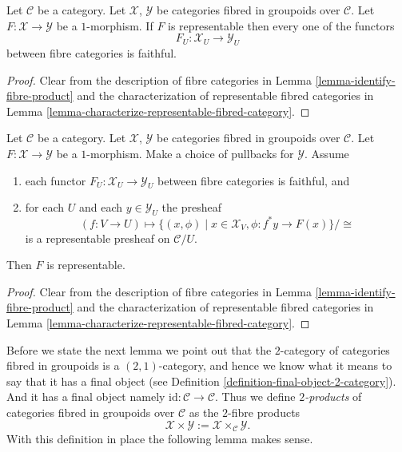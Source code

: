 \begin{lemma}
\label{lemma-spell-out-representable-map-stack-in-groupoids}
Let $\mathcal{C}$ be a category.
Let $\mathcal{X}$, $\mathcal{Y}$ be categories fibred in groupoids
over $\mathcal{C}$.
Let $F : \mathcal{X} \to \mathcal{Y}$ be a $1$-morphism.
If $F$ is representable then every one of the functors
$$
F_U : \mathcal{X}_U \longrightarrow \mathcal{Y}_U
$$
between fibre categories is faithful.
\end{lemma}

\begin{proof}
Clear from the description of fibre categories in
Lemma \ref{lemma-identify-fibre-product} and the characterization
of representable fibred categories in
Lemma \ref{lemma-characterize-representable-fibred-category}.
\end{proof}

\begin{lemma}
\label{lemma-criterion-representable-map-stack-in-groupoids}
Let $\mathcal{C}$ be a category.
Let $\mathcal{X}$, $\mathcal{Y}$ be categories fibred in groupoids
over $\mathcal{C}$.
Let $F : \mathcal{X} \to \mathcal{Y}$ be a $1$-morphism.
Make a choice of pullbacks for $\mathcal{Y}$.
Assume
\begin{enumerate}
\item each functor $F_U : \mathcal{X}_U \longrightarrow \mathcal{Y}_U$
between fibre categories is faithful, and
\item for each $U$ and each $y \in \mathcal{Y}_U$ the presheaf
$$
(f : V \to U)
\longmapsto
\{(x, \phi) \mid x \in \mathcal{X}_V, \phi : f^*y \to F(x)\}/\cong
$$
is a representable presheaf on $\mathcal{C}/U$.
\end{enumerate}
Then $F$ is representable.
\end{lemma}

\begin{proof}
Clear from the description of fibre categories in
Lemma \ref{lemma-identify-fibre-product} and the characterization
of representable fibred categories in
Lemma \ref{lemma-characterize-representable-fibred-category}.
\end{proof}

\noindent
Before we state the next lemma we point out that the $2$-category
of categories fibred in groupoids is a $(2, 1)$-category, and hence
we know what it means to say that it has a final object (see
Definition \ref{definition-final-object-2-category}). And it has
a final object namely $\text{id} : \mathcal{C} \to \mathcal{C}$.
Thus we define {\it $2$-products} of categories fibred in groupoids
over $\mathcal{C}$ as the $2$-fibre products
$$
\mathcal{X} \times \mathcal{Y} :=
\mathcal{X} \times_\mathcal{C} \mathcal{Y}.
$$
With this definition in place the following lemma makes sense.

